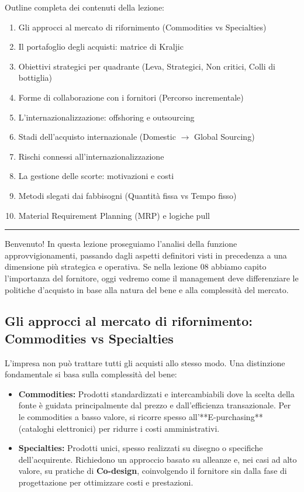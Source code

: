 \documentclass[a4paper,10pt]{article}
\begin{document}
Outline completa dei contenuti della lezione:
{\small
\begin{enumerate}
\item Gli approcci al mercato di rifornimento (Commodities vs Specialties)
\item Il portafoglio degli acquisti: matrice di Kraljic
\item Obiettivi strategici per quadrante (Leva, Strategici, Non critici, Colli di bottiglia)
\item Forme di collaborazione con i fornitori (Percorso incrementale)
\item L’internazionalizzazione: offshoring e outsourcing
\item Stadi dell’acquisto internazionale (Domestic $\rightarrow$ Global Sourcing)
\item Rischi connessi all’internazionalizzazione
\item La gestione delle scorte: motivazioni e costi
\item Metodi slegati dai fabbisogni (Quantità fissa vs Tempo fisso)
\item Material Requirement Planning (MRP) e logiche pull
\end{enumerate}
}
\hrule
\vspace{0.5cm}

Benvenuto! In questa lezione proseguiamo l'analisi della funzione approvvigionamenti, passando dagli aspetti definitori visti in precedenza a una dimensione più strategica e operativa. Se nella lezione 08 abbiamo capito l'importanza del fornitore, oggi vedremo come il management deve differenziare le politiche d'acquisto in base alla natura del bene e alla complessità del mercato.

\subsection*{Gli approcci al mercato di rifornimento: Commodities vs Specialties}

L'impresa non può trattare tutti gli acquisti allo stesso modo. Una distinzione fondamentale si basa sulla complessità del bene:
\begin{itemize}
    \item \textbf{Commodities:} Prodotti standardizzati e intercambiabili dove la scelta della fonte è guidata principalmente dal prezzo e dall'efficienza transazionale. Per le commodities a basso valore, si ricorre spesso all'**E-purchasing** (cataloghi elettronici) per ridurre i costi amministrativi.
    \item \textbf{Specialties:} Prodotti unici, spesso realizzati su disegno o specifiche dell'acquirente. Richiedono un approccio basato su alleanze e, nei casi ad alto valore, su pratiche di \textbf{Co-design}, coinvolgendo il fornitore sin dalla fase di progettazione per ottimizzare costi e prestazioni.
\end{itemize}
\end{document}
